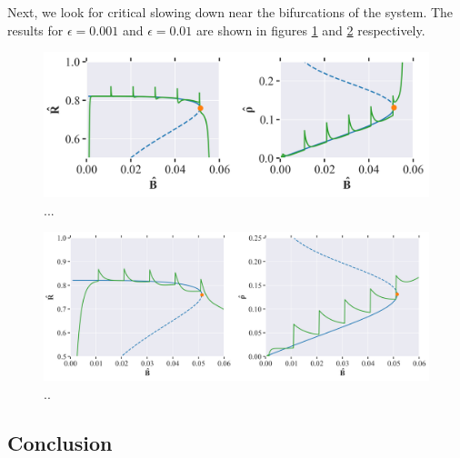 Next, we look for critical slowing down near the bifurcations of the system. The results for $\epsilon = 0.001$ and $\epsilon = 0.01$ are shown in figures \ref{fig:cell_biology_critical_slowing_down_small} and \ref{fig:cell_biology_critical_slowing_down_big} respectively.
\begin{figure}[H]
    \centering
    \includegraphics[width= \textwidth]{figures/cb_critslow_R(0)=0.0_rho(0)=0.0_B(0)_0.001_eps=0.001_Bmax=0.04.png}
    \caption{...}
    \label{fig:cell_biology_critical_slowing_down_small}
\end{figure}

\begin{figure}[H]
    \centering
    \includegraphics[width= \textwidth]{figures/cb_critslow_R(0)=0.0_rho(0)=0.0_B(0)_0.001_eps=0.01_Bmax=0.04.png}
    \caption{..}
    \label{fig:cell_biology_critical_slowing_down_big}
\end{figure}

\subsection{Conclusion}
